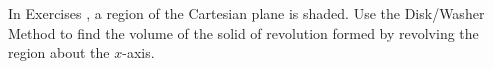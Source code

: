 {\noindent In Exercises}
{, a region of the Cartesian plane is shaded. Use the Disk/Washer Method to find the volume of the solid of revolution formed by revolving the region about the $x$-axis.
}
